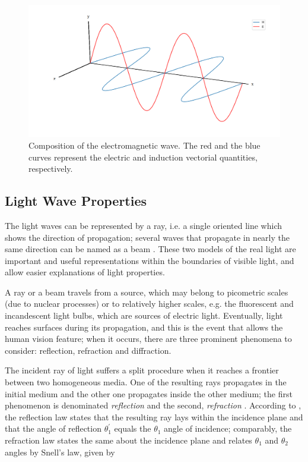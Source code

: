 \begin{figure}[htb]
	\centering
	\caption{\label{fig:electromagnetic_wave} 
		Composition of the electromagnetic wave. The red and the blue curves represent the electric and induction vectorial quantities, respectively.}
	\begin{center}
	    \includegraphics[scale=0.3]
			{images/fig2.png}
	\end{center}
	\centering
	\fautor
\end{figure}

\subsection{Light Wave Properties}

The light waves can be represented by a ray, i.e. a single oriented line which shows the direction of propagation; several waves that propagate in nearly the same direction can be named as a beam \cite{halliday2013fundamentals}. These two models of the real light are important and useful representations within the boundaries of visible light, and allow easier explanations of light properties.

A ray or a beam travels from a source, which may belong to picometric scales (due to nuclear processes) or to relatively higher scales, e.g. the fluorescent and incandescent light bulbs, which are sources of electric light. Eventually, light reaches surfaces during its propagation, and this is the event that allows the human vision feature; when it occurs, there are three prominent phenomena to consider: reflection, refraction and diffraction.

The incident ray of light suffers a split procedure when it reaches a frontier between two homogeneous media. One of the resulting rays propagates in the initial medium and the other one propagates inside the other medium; the first phenomenon is denominated \emph{reflection} and the second, \emph{refraction} \cite{born1999principles}. According to , the reflection law states that the resulting ray lays within the incidence plane and that the angle of reflection $\mathit{\theta^{'}_{1}}$ equals the $\mathit{\theta_{1}}$ angle of incidence; comparably, the refraction law states the same about the incidence plane and relates $\mathit{\theta_{1}}$ and $\mathit{\theta_{2}}$ angles by Snell's law, given by

